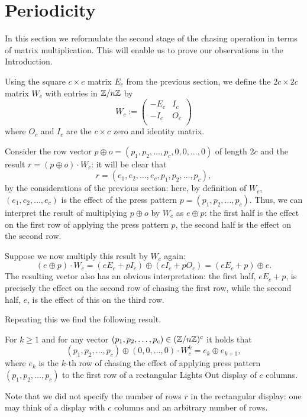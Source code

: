 \section{Periodicity}\label{sec:algebra}
In this section we reformulate the second stage of
the chasing operation in terms of matrix multiplication.
This will enable us to prove our observations in the Introduction.

Using the square $c\times c$ matrix $E_c$ from the previous
section, we define the $2c\times 2c$ matrix $W_{c}$ with entries in
$\mathbb{Z}/n\mathbb{Z}$ by
\[
W_{c} := \left(
\begin{array}{cc}
  -E_{c} & I_{c} \\
  -I_{c} & O_{c} \\
\end{array}
\right)
\]
where $O_c$ and $I_c$ are the $c\times c$ zero and
identity matrix.

Consider the row vector $p\oplus o=(p_1, p_2, \ldots, p_c, 0, 0, \ldots, 0)$
of length $2c$ and the result $r=(p\oplus o)\cdot W_c$: it will be clear that
$$r=(e_1, e_2, \ldots, e_c, p_1, p_2, \ldots, p_c),$$
by the considerations of the previous section:
here, by definition of $W_c$,
$(e_1, e_2, \ldots, e_c)$ is the effect of
the press pattern $p=(p_1, p_2, \ldots, p_c)$. Thus, we can
interpret the result of multiplying $p\oplus o$ by $W_c$
as $e\oplus p$: the first half is the effect on the first
row of applying the press pattern $p$, the second half is the
effect on the second row.

Suppose we now multiply this result by $W_c$ again:
$$(e\oplus p)\cdot W_c=(eE_c+pI_c)\oplus (eI_c+pO_c)=(eE_c+p)\oplus e.$$
The resulting vector also has an obvious interpretation:
the first half, $eE_c+p$, is precisely the effect on
the second row of chasing the first row, while the
second half, $e$, is the effect of this on the third row.

Repeating this we find the following result.

\begin{lemma}
For $k\geq 1$ and for any vector
$(p_1, p_2, \ldots, p_c)\in (\mathbb{Z}/n\mathbb{Z})^c$ it holds that
$$(p_1, p_2, \ldots, p_c)\oplus (0, 0, \ldots,0)\cdot W_c^k=e_k\oplus e_{k+1},$$
where $e_k$ is the $k$-th row of chasing the effect of applying
press pattern $(p_1, p_2, \ldots, p_c)$ to the first row of a
rectangular Lights Out display of $c$ columns.
\end{lemma}
Note that we did not specify the number of rows $r$ in the rectangular
display: %
one may think of a display with $c$ columns and an arbitrary number
of rows.

